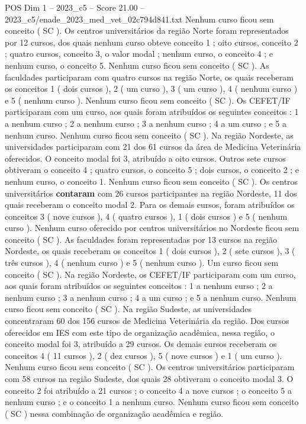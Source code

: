 \begin{textsample}{POS Dim 1 – 2023\_c5 – Score 21.00 – 2023\_c5/enade\_2023\_med\_vet\_02c794d841.txt}
Nenhum curso ficou sem conceito ( SC ).
Os centros universitários da região Norte foram representados por 12 cursos, dos quais nenhum curso obteve conceito 1 ; oito cursos, conceito 2 ; quatro cursos, conceito 3, o valor modal ; nenhum curso, o conceito 4 ; e nenhum curso, o conceito 5.
Nenhum curso ficou sem conceito ( SC ).
As faculdades participaram com quatro cursos na região Norte, os quais receberam os conceitos 1 ( dois cursos ), 2 ( um curso ), 3 ( um curso ), 4 ( nenhum curso ) e 5 ( nenhum curso ).
Nenhum curso ficou sem conceito ( SC ).
Os CEFET/IF participaram com um curso, aos quais foram atribuídos os seguintes conceitos : 1 a nenhum curso ; 2 a nenhum curso ; 3 a nenhum curso ; 4 a um curso ; e 5 a nenhum curso.
Nenhum curso ficou sem conceito ( SC ).
Na região Nordeste, as universidades participaram com 21 dos 61 cursos da área de Medicina Veterinária oferecidos.
O conceito modal foi 3, atribuído a oito cursos.
Outros sete cursos obtiveram o conceito 4 ; quatro cursos, o conceito 5 ; dois cursos, o conceito 2 ; e nenhum curso, o conceito 1.
Nenhum curso ficou sem conceito ( SC ).
Os centros universitários \textbf{contaram} com 26 cursos participantes na região Nordeste, 11 dos quais receberam o conceito modal 2.
Para os demais cursos, foram atribuídos os conceitos 3 ( nove cursos ), 4 ( quatro cursos ), 1 ( dois cursos ) e 5 ( nenhum curso ).
Nenhum curso oferecido por centros universitários no Nordeste ficou sem conceito ( SC ).
As faculdades foram representadas por 13 cursos na região Nordeste, os quais receberam os conceitos 1 ( dois cursos ), 2 ( sete cursos ), 3 ( três cursos ), 4 ( nenhum curso ) e 5 ( nenhum curso ).
Um curso ficou sem conceito ( SC ).
Na região Nordeste, os CEFET/IF participaram com um curso, aos quais foram atribuídos os seguintes conceitos : 1 a nenhum curso ; 2 a nenhum curso ; 3 a nenhum curso ; 4 a um curso ; e 5 a nenhum curso.
Nenhum curso ficou sem conceito ( SC ).
Na região Sudeste, as universidades concentraram 60 dos 156 cursos de Medicina Veterinária da região.
Dos cursos oferecidos em IES com este tipo de organização acadêmica, nessa região, o conceito modal foi 3, atribuído a 29 cursos.
Os demais cursos receberam os conceitos 4 ( 11 cursos ), 2 ( dez cursos ), 5 ( nove cursos ) e 1 ( um curso ).
Nenhum curso ficou sem conceito ( SC ).
Os centros universitários participaram com 58 cursos na região Sudeste, dos quais 28 obtiveram o conceito modal 3.
O conceito 2 foi atribuído a 21 cursos ; o conceito 4 a nove cursos ; o conceito 5 a nenhum curso ; e o conceito 1 a nenhum curso.
Nenhum curso ficou sem conceito ( SC ) nessa combinação de organização acadêmica e região.

\end{textsample}
